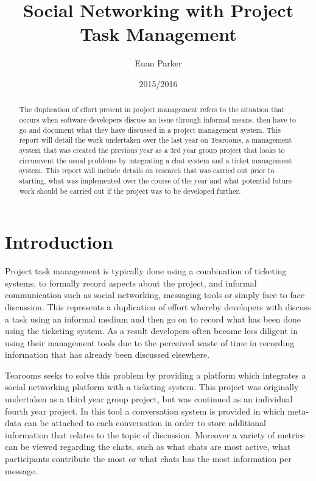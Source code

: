 \documentclass{l4proj}
\begin{document}
\title{Social Networking with Project Task Management}
\author{Euan Parker}
\date{2015/2016}
\maketitle

\begin{abstract}

The duplication of effort present in project management refers to the situation that occurs when software developers discuss an issue through informal means, then have to go and document what they have discussed in a project management system.  This report will detail the work undertaken over the last year on Tearooms, a management system that was created the previous year as a 3rd year group project that looks to circumvent the usual problems by integrating a chat system and a ticket management system.  This report will include details on research that was carried out prior to starting, what was implemented over the course of the year and what potential future work should be carried out if the project was to be developed further.

\end{abstract}

\educationalconsent
%
%
\tableofcontents

\chapter{Introduction}


Project task management is typically done using a combination of ticketing systems, to formally record aspects about the project, and informal communication such as social networking, messaging tools or simply face to face discussion. This represents a duplication of effort whereby developers with discuss a task using an informal medium and then go on to record what has been done using the ticketing system.  As a result developers often become less diligent in using their management tools due to the perceived waste of time in recording information that has already been discussed elsewhere. 

Tearooms seeks to solve this problem by providing a platform which integrates a social networking platform with a ticketing system. This project was originally undertaken as a third year group project, but was continued as an individual fourth year project.  In this tool a conversation system is provided in which meta-data can be attached to each conversation in order to store additional information that relates to the topic of discussion.  Moreover a variety of metrics can be viewed regarding the chats, such as what chats are most active, what participants contribute the most or what chats has the most information per message.
\end{document}
